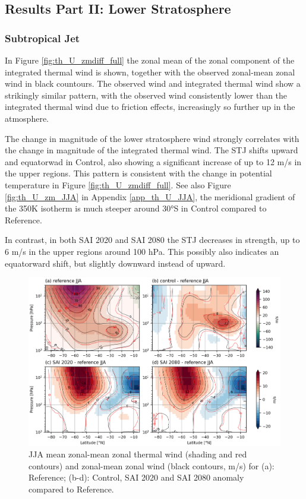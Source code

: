 \subsection{Results Part II: Lower Stratosphere}\label{lowerstrat}

\subsubsection{Subtropical Jet}
In Figure \ref{fig:th_U_zmdiff_full} the zonal mean of the zonal component of the integrated thermal wind is shown, together with the observed zonal-mean zonal wind in black countours. The observed wind and integrated thermal wind show a strikingly similar pattern, with the observed wind consistently lower than the integrated thermal wind due to friction effects, increasingly so further up in the atmosphere. 

The change in magnitude of the lower stratosphere wind strongly correlates with the change in magnitude of the integrated thermal wind. The STJ shifts upward and equatorwad in Control, also showing a significant increase of up to 12 m/s in the upper regions. This pattern is consistent with the change in potential temperature in Figure \ref{fig:th_U_zmdiff_full}. See also Figure \ref{fig:th_U_zm_JJA} in Appendix \ref{app_th_U_JJA}, the meridional gradient of the 350K isotherm is much steeper around 30°S in Control compared to Reference.

In contrast, in both SAI 2020 and SAI 2080 the STJ decreases in strength, up to 6 m/s in the upper regions around 100 hPa. This possibly also indicates an equatorward shift, but slightly downward instead of upward. 

\begin{figure}[H]
	\centering
	\includegraphics[width=0.95\linewidth]{images/UT_U_zmdiff_JJA.png}
	\caption{JJA mean zonal-mean zonal thermal wind (shading and red contours) and zonal-mean zonal wind (black contours, m/s) for (a): Reference; (b-d): Control, SAI 2020 and SAI 2080 anomaly compared to Reference.}
	\label{fig:UT_U_zmdiff_JJA}
\end{figure}

